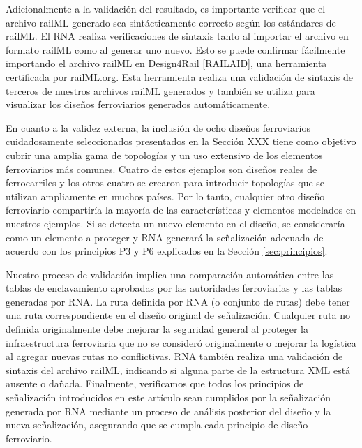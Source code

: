     Adicionalmente a la validación del resultado, es importante verificar que el archivo railML generado sea sintácticamente correcto según los estándares de railML. El RNA realiza verificaciones de sintaxis tanto al importar el archivo en formato railML como al generar uno nuevo. Esto se puede confirmar fácilmente importando el archivo railML en Design4Rail [RAILAID], una herramienta certificada por railML.org. Esta herramienta realiza una validación de sintaxis de terceros de nuestros archivos railML generados y también se utiliza para visualizar los diseños ferroviarios generados automáticamente.

    En cuanto a la validez externa, la inclusión de ocho diseños ferroviarios cuidadosamente seleccionados presentados en la Sección XXX tiene como objetivo cubrir una amplia gama de topologías y un uso extensivo de los elementos ferroviarios más comunes. Cuatro de estos ejemplos son diseños reales de ferrocarriles y los otros cuatro se crearon para introducir topologías que se utilizan ampliamente en muchos países. Por lo tanto, cualquier otro diseño ferroviario compartiría la mayoría de las características y elementos modelados en nuestros ejemplos. Si se detecta un nuevo elemento en el diseño, se consideraría como un elemento a proteger y RNA generará la señalización adecuada de acuerdo con los principios P3 y P6 explicados en la Sección \ref{sec:principios}.

    Nuestro proceso de validación implica una comparación automática entre las tablas de enclavamiento aprobadas por las autoridades ferroviarias y las tablas generadas por RNA. La ruta definida por RNA (o conjunto de rutas) debe tener una ruta correspondiente en el diseño original de señalización. Cualquier ruta no definida originalmente debe mejorar la seguridad general al proteger la infraestructura ferroviaria que no se consideró originalmente o mejorar la logística al agregar nuevas rutas no conflictivas. RNA también realiza una validación de sintaxis del archivo railML, indicando si alguna parte de la estructura XML está ausente o dañada. Finalmente, verificamos que todos los principios de señalización introducidos en este artículo sean cumplidos por la señalización generada por RNA mediante un proceso de análisis posterior del diseño y la nueva señalización, asegurando que se cumpla cada principio de diseño ferroviario.